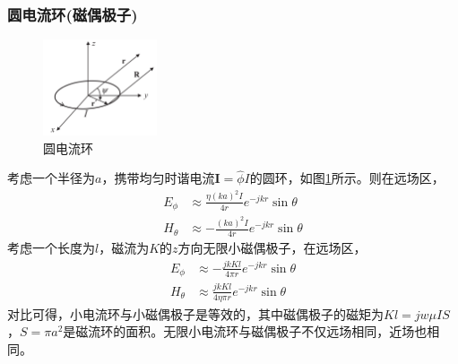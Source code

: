 \documentclass{article}
\numberwithin{equation}{section}
\begin{document}
\subsubsection{圆电流环(磁偶极子)}
\begin{figure}[ht]
    \centering
    \includegraphics[width=0.3\textwidth]{圆电流环.PNG}
    \caption{圆电流环}
    \label{fig:fig3}
\end{figure}
考虑一个半径为$a$，携带均匀时谐电流$\mathbf{I}=\hat{\phi}I$的圆环，如图\ref{fig:fig3}所示。则在远场区，
\begin{align}
    \label{eq:eq135}
    E_{\phi}&\approx\frac{\eta(ka)^2I}{4r}e^{-jkr}\sin\theta \\
    \label{eq:eq136}
    H_{\theta}&\approx-\frac{(ka)^2I}{4r}e^{-jkr}\sin\theta
\end{align}
考虑一个长度为$l$，磁流为$K$的$z$方向无限小磁偶极子，在远场区，
\begin{align}
    \label{eq:eq156}
    E_{\phi}&\approx-\frac{jkKl}{4\pi r}e^{-jkr}\sin\theta \\
    \label{eq:eq157}
    H_{\theta}&\approx\frac{jkKl}{4\eta\pi r}e^{-jkr}\sin\theta
\end{align}
对比可得，小电流环与小磁偶极子是等效的，其中磁偶极子的磁矩为$Kl=jw\mu IS$，$S=\pi a^2$是磁流环的面积。无限小电流环与磁偶极子不仅远场相同，近场也相同。
\end{document}
